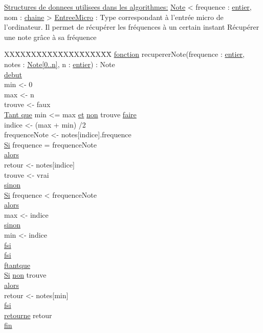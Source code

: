 \ul{Structures de donnees utilisees dans les algorithmes:}\newline
\ul{Note} < frequence : \ul{entier}, nom : \ul{chaine} >\newline
\ul{EntreeMicro} : Type correspondant à l'entrée micro de l'ordinateur. Il permet de récupérer les fréquences à un certain instant\newline
Récupérer une note grâce à sa fréquence\newline
\begin{tabbing}
\kill XX\=XX\=XX\=XX\=XX\=XX\=XX\=XX\=XX\=XX\=
\kill
\ul{fonction} recupererNote(frequence : \ul{entier}, notes : \ul{Note[0..n]}, n : \ul{entier}) : Note\\
\ul{debut}\\
\>min <- 0\\
\>max <- n\\
\>trouve <- faux\\
\>\ul{Tant que} min <= max \ul{et} \ul{non} trouve \ul{faire}\\
    \>\>indice <- (max + min) /2 \\
    \>\>frequenceNote <- notes[indice].frequence\\
    \>\>\ul{Si} frequence = frequenceNote\\
    \>\>\ul{alors}\\
        \>\>\>retour <- notes[indice]\\
        \>\>\>trouve <- vrai\\
    \>\>\ul{sinon}\\
        \>\>\>\ul{Si} frequence < frequenceNote\\
        \>\>\>\ul{alors}\\
            \>\>\>\>max <- indice\\
        \>\>\>\ul{sinon}\\
            \>\>\>\>min <- indice\\
        \>\>\>\ul{fsi}\\
    \>\>\ul{fsi}\\
\>\ul{ftantque}\\
\>\ul{Si} \ul{non} trouve\\
\>\ul{alors}\\
    \>\>retour <- notes[min]\\
\>\ul{fsi}\\
\>\ul{retourne} retour\\
\ul{fin}\\
\end{tabbing}
